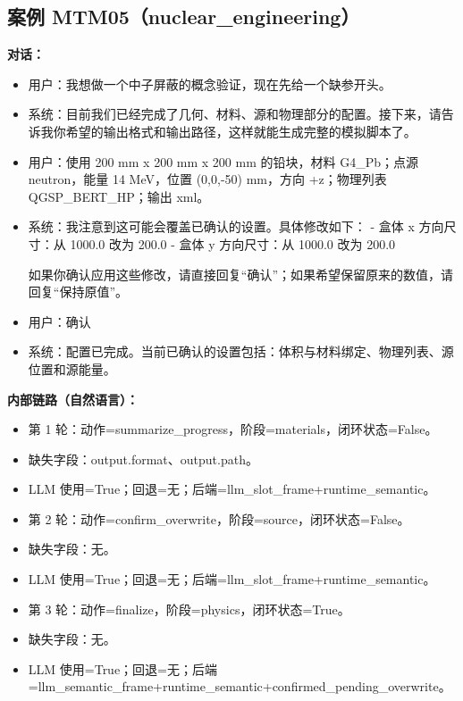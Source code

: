\documentclass[11pt]{ctexart}
\begin{document}
\subsection{案例 MTM05（nuclear\_engineering）}
\textbf{对话：}
\begin{itemize}
\item 用户：我想做一个中子屏蔽的概念验证，现在先给一个缺参开头。
\item 系统：目前我们已经完成了几何、材料、源和物理部分的配置。接下来，请告诉我你希望的输出格式和输出路径，这样就能生成完整的模拟脚本了。
\item 用户：使用 200 mm x 200 mm x 200 mm 的铅块，材料 G4\_Pb；点源 neutron，能量 14 MeV，位置 (0,0,-50) mm，方向 +z；物理列表 QGSP\_BERT\_HP；输出 xml。
\item 系统：我注意到这可能会覆盖已确认的设置。具体修改如下：
- 盒体 x 方向尺寸：从 1000.0 改为 200.0
- 盒体 y 方向尺寸：从 1000.0 改为 200.0

如果你确认应用这些修改，请直接回复“确认”；如果希望保留原来的数值，请回复“保持原值”。
\item 用户：确认
\item 系统：配置已完成。当前已确认的设置包括：体积与材料绑定、物理列表、源位置和源能量。
\end{itemize}
\textbf{内部链路（自然语言）：}
\begin{itemize}
\item 第 1 轮：动作=summarize\_progress，阶段=materials，闭环状态=False。
\item 缺失字段：output.format、output.path。
\item LLM 使用=True；回退=无；后端=llm\_slot\_frame+runtime\_semantic。
\item 第 2 轮：动作=confirm\_overwrite，阶段=source，闭环状态=False。
\item 缺失字段：无。
\item LLM 使用=True；回退=无；后端=llm\_slot\_frame+runtime\_semantic。
\item 第 3 轮：动作=finalize，阶段=physics，闭环状态=True。
\item 缺失字段：无。
\item LLM 使用=True；回退=无；后端=llm\_semantic\_frame+runtime\_semantic+confirmed\_pending\_overwrite。
\end{itemize}
\end{document}
